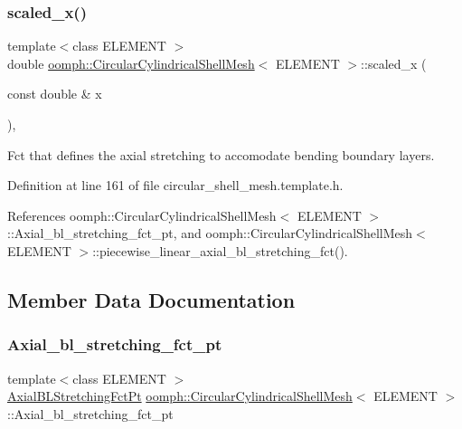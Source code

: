 \subsubsection{\texorpdfstring{scaled\+\_\+x()}{scaled\_x()}}
{\footnotesize\ttfamily template$<$class E\+L\+E\+M\+E\+NT $>$ \\
double \hyperlink{classoomph_1_1CircularCylindricalShellMesh}{oomph\+::\+Circular\+Cylindrical\+Shell\+Mesh}$<$ E\+L\+E\+M\+E\+NT $>$\+::scaled\+\_\+x (\begin{DoxyParamCaption}\item[{const double \&}]{x }\end{DoxyParamCaption})\hspace{0.3cm}{\ttfamily [inline]}, {\ttfamily [private]}}



Fct that defines the axial stretching to accomodate bending boundary layers. 



Definition at line 161 of file circular\+\_\+shell\+\_\+mesh.\+template.\+h.



References oomph\+::\+Circular\+Cylindrical\+Shell\+Mesh$<$ E\+L\+E\+M\+E\+N\+T $>$\+::\+Axial\+\_\+bl\+\_\+stretching\+\_\+fct\+\_\+pt, and oomph\+::\+Circular\+Cylindrical\+Shell\+Mesh$<$ E\+L\+E\+M\+E\+N\+T $>$\+::piecewise\+\_\+linear\+\_\+axial\+\_\+bl\+\_\+stretching\+\_\+fct().



\subsection{Member Data Documentation}
\mbox{\label{classoomph_1_1CircularCylindricalShellMesh_a5669a7c088fe0d30f7d011275861f6b9}} 
\subsubsection{\texorpdfstring{Axial\+\_\+bl\+\_\+stretching\+\_\+fct\+\_\+pt}{Axial\_bl\_stretching\_fct\_pt}}
{\footnotesize\ttfamily template$<$class E\+L\+E\+M\+E\+NT $>$ \\
\hyperlink{classoomph_1_1CircularCylindricalShellMesh_a770336fa72e8911f31b9fe3f70197a51}{Axial\+B\+L\+Stretching\+Fct\+Pt} \hyperlink{classoomph_1_1CircularCylindricalShellMesh}{oomph\+::\+Circular\+Cylindrical\+Shell\+Mesh}$<$ E\+L\+E\+M\+E\+NT $>$\+::Axial\+\_\+bl\+\_\+stretching\+\_\+fct\+\_\+pt\hspace{0.3cm}{\ttfamily [private]}}



